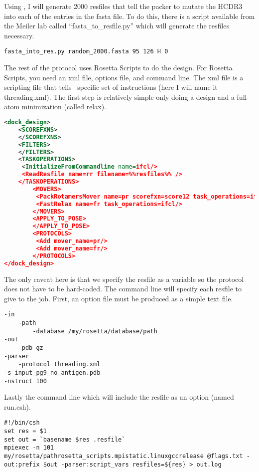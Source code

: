 Using \rosettadesign, I will generate 2000 resfiles that tell the packer to mutate the HCDR3 into each of the entries in the fasta file. To do this, there is a script available from the Meiler lab called ``fasta\_to\_resfile.py'' which will generate the resfiles necessary.

\begin{lstlisting}[breaklines=true]
fasta_into_res.py random_2000.fasta 95 126 H 0
\end{lstlisting}

The rest of the protocol uses Rosetta Scripts to do the design. For Rosetta Scripts, you need an xml file, options file, and command line. The xml file is a scripting file that tells \rosetta~specific set of instructions (here I will name it threading.xml). The first step is relatively simple only doing a design and a full-atom minimization (called relax).

\begin{lstlisting}[breaklines=true, language=xml]
<dock_design>
    <SCOREFXNS>
    </SCOREFXNS>
    <FILTERS>
    </FILTERS>
    <TASKOPERATIONS>
     <InitializeFromCommandline name=ifcl/>
     <ReadResfile name=rr filename=%%resfiles%% />
    </TASKOPERATIONS>
        <MOVERS>
         <PackRotamersMover name=pr scorefxn=score12 task_operations=ifcl,rr/>
         <FastRelax name=fr task_operations=ifcl/>
        </MOVERS>
        <APPLY_TO_POSE>
        </APPLY_TO_POSE>
        <PROTOCOLS>
         <Add mover_name=pr/>
         <Add mover_name=fr/>
        </PROTOCOLS>
</dock_design>
\end{lstlisting}

The only caveat here is that we specify the resfile as a variable so the protocol does not have to be hard-coded. The command line will specify each resfile to give to the job. First, an option file must be produced as a simple text file.


\begin{lstlisting}[breaklines=true]
-in
    -path
        -database /my/rosetta/database/path
-out
    -pdb_gz
-parser
    -protocol threading.xml
-s input_pg9_no_antigen.pdb
-nstruct 100
\end{lstlisting}

Lastly the command line which will include the resfile as an option (named run.csh).

\begin{lstlisting}[breaklines=true]
#!/bin/csh
set res = $1
set out = `basename $res .resfile`
mpiexec -n 101 my/rosetta/pathrosetta_scripts.mpistatic.linuxgccrelease @flags.txt -out:prefix $out -parser:script_vars resfiles=${res} > out.log
\end{lstlisting}

